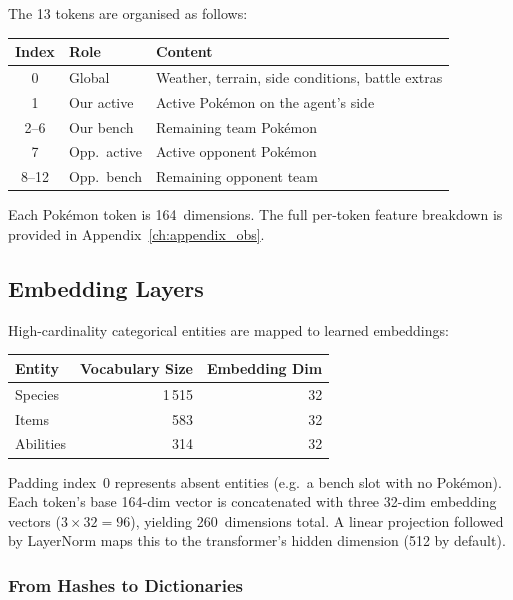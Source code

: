 The 13 tokens are organised as follows:

\begin{center}
\small
\begin{tabularx}{0.7\textwidth}{c l l}
  \toprule
  \textbf{Index} & \textbf{Role} & \textbf{Content} \\
  \midrule
  0        & Global      & Weather, terrain, side conditions, battle extras \\
  1        & Our active  & Active Pok\'{e}mon on the agent's side \\
  2--6     & Our bench   & Remaining team Pok\'{e}mon \\
  7        & Opp.\ active & Active opponent Pok\'{e}mon \\
  8--12    & Opp.\ bench  & Remaining opponent team \\
  \bottomrule
\end{tabularx}
\end{center}

Each Pok\'{e}mon token is 164~dimensions.  The full per-token feature
breakdown is provided in Appendix~\ref{ch:appendix_obs}.

\subsection{Embedding Layers}

High-cardinality categorical entities are mapped to learned embeddings:

\begin{center}
\small
\begin{tabularx}{0.7\textwidth}{l r r}
  \toprule
  \textbf{Entity} & \textbf{Vocabulary Size} & \textbf{Embedding Dim} \\
  \midrule
    Species   & 1\,515 & 32 \\
  Items     & 583    & 32 \\
  Abilities & 314    & 32 \\
  \bottomrule
\end{tabularx}
\end{center}

Padding index~0 represents absent entities (e.g.\ a bench slot with no
Pok\'{e}mon).  Each token's base 164-dim vector is concatenated with three
32-dim embedding vectors ($3 \times 32 = 96$), yielding 260~dimensions total.
A linear projection followed by LayerNorm maps this to the transformer's hidden
dimension (512 by default).

\subsubsection{From Hashes to Dictionaries}

